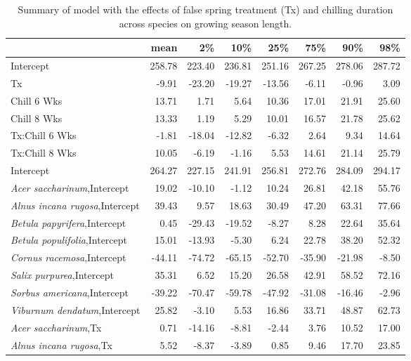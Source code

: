 \documentclass{article}\usepackage[]{graphicx}\usepackage[]{color}
\begin{document}
\newpage
\begin{longtable}{lrrrrrrr}
\caption{Summary of model with the effects of false spring treatment (Tx) and chilling duration across species on growing season length.} \\ 
  \hline
 & mean & 2\% & 10\% & 25\% & 75\% & 90\% & 98\% \\ 
  \hline \endhead  \hline
Intercept & 258.78 & 223.40 & 236.81 & 251.16 & 267.25 & 278.06 & 287.72 \\ 
  Tx & -9.91 & -23.20 & -19.27 & -13.56 & -6.11 & -0.96 & 3.09 \\ 
  Chill 6 Wks & 13.71 & 1.71 & 5.64 & 10.36 & 17.01 & 21.91 & 25.60 \\ 
  Chill 8 Wks & 13.33 & 1.19 & 5.29 & 10.01 & 16.57 & 21.78 & 25.62 \\ 
  Tx:Chill 6 Wks & -1.81 & -18.04 & -12.82 & -6.32 & 2.64 & 9.34 & 14.64 \\ 
  Tx:Chill 8 Wks & 10.05 & -6.19 & -1.16 & 5.53 & 14.61 & 21.14 & 25.79 \\ 
  Intercept & 264.27 & 227.15 & 241.91 & 256.81 & 272.76 & 284.09 & 294.17 \\ 
  \textit{Acer saccharinum},Intercept & 19.02 & -10.10 & -1.12 & 10.24 & 26.81 & 42.18 & 55.76 \\ 
  \textit{Alnus incana rugosa},Intercept & 39.43 & 9.57 & 18.63 & 30.49 & 47.20 & 63.31 & 77.66 \\ 
  \textit{Betula papyrifera},Intercept & 0.45 & -29.43 & -19.52 & -8.27 & 8.28 & 22.64 & 35.64 \\ 
  \textit{Betula populifolia},Intercept & 15.01 & -13.93 & -5.30 & 6.24 & 22.78 & 38.20 & 52.32 \\ 
  \textit{Cornus racemosa},Intercept & -44.11 & -74.72 & -65.15 & -52.70 & -35.90 & -21.98 & -8.50 \\ 
  \textit{Salix purpurea},Intercept & 35.31 & 6.52 & 15.20 & 26.58 & 42.91 & 58.52 & 72.16 \\ 
  \textit{Sorbus americana},Intercept & -39.22 & -70.47 & -59.78 & -47.92 & -31.08 & -16.46 & -2.96 \\ 
  \textit{Viburnum dendatum},Intercept & 25.82 & -3.10 & 5.53 & 16.86 & 33.71 & 48.87 & 62.73 \\ 
  \textit{Acer saccharinum},Tx & 0.71 & -14.16 & -8.81 & -2.44 & 3.76 & 10.52 & 17.00 \\ 
  \textit{Alnus incana rugosa},Tx & 5.52 & -8.37 & -3.89 & 0.85 & 9.46 & 17.70 & 23.85 \\ 

\end{longtable}
\end{document}
